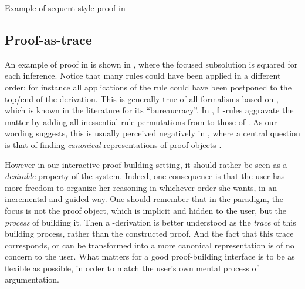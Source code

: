 \begin{scope}
\begin{marginfigure}

\caption{Example of sequent-style proof in }
\end{marginfigure}

\subsection{Proof-as-trace}

An example of proof in  is shown in , where the
focused subsolution is squared for each inference. Notice that many rules could
have been applied in a different order: for instance all applications of the
{} rule could have been postponed to the top/end of the derivation.
This is generally true of all formalisms based on , which is known in the
 literature for its ``bureaucracy''. In ,
$\mathbb{H}$-rules aggravate the matter by adding all inessential rule
permutations from  to those of . As our wording suggests,
this is usually perceived negatively in  , where a
central question is that of finding \emph{canonical} representations of proof
objects .

However in our interactive proof-building setting, it should rather be seen as a
\emph{desirable} property of the system. Indeed, one consequence is that the
user has more freedom to organize her reasoning in whichever order she wants, in
an incremental and guided way. One should remember that in the 
paradigm, the focus is not the proof object, which is implicit and hidden to the
user, but the \emph{process} of building it. Then a -derivation is
better understood as the \emph{trace} of this building process, rather than the
constructed proof. And the fact that this trace corresponds, or
can be transformed into a more canonical representation is of no concern to the
user. What matters for a good proof-building interface is to be as flexible as
possible, in order to match the user's own mental process of argumentation.


\end{scope}
